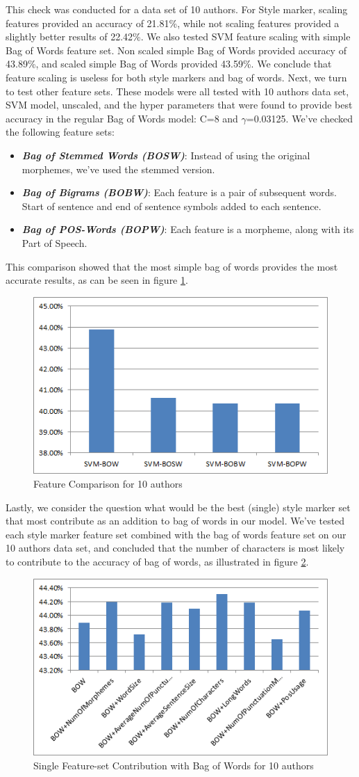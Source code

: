 \documentclass[a4paper]{article}
\begin{document}
This check was conducted for a data set of 10 authors.
For Style marker, scaling features provided an accuracy of 21.81\%, while not scaling features provided a slightly better results of 22.42\%.
We also tested SVM feature scaling with simple Bag of Words feature set.
Non scaled simple Bag of Words provided accuracy of 43.89\%, and scaled simple Bag of Words provided 43.59\%.
We conclude that feature scaling is useless for both style markers and bag of words.
Next, we turn to test other feature sets. These models were all tested with 10 authors data set, SVM model, unscaled, and the hyper parameters that were found to provide best accuracy in the regular Bag of Words model: C=8 and $\gamma$=0.03125. We've checked the following feature sets:
\begin{itemize}
\item \textbf{\emph{Bag of Stemmed Words (BOSW)}}: Instead of using the original morphemes, we've used the stemmed version.
\item \textbf{\emph{Bag of Bigrams (BOBW)}}: Each feature is a pair of subsequent words. Start of sentence and end of sentence symbols added to each sentence.
\item \textbf{\emph{Bag of POS-Words (BOPW)}}: Each feature is a morpheme, along with its Part of Speech.
\end{itemize}
This comparison showed that the most simple bag of words provides the most accurate results, as can be seen in figure \ref{fig:feature comparison}.
\begin{figure}[!h]
	\centering
	\includegraphics[width=.5\textwidth]{"figures/feature_comparison"}
	\caption{Feature Comparison for 10 authors}
	\label{fig:feature comparison}
\end{figure}
Lastly, we consider the question what would be the best (single) style marker set that most contribute as an addition to bag of words in our model.
We've tested each style marker feature set combined with the bag of words feature set on our 10 authors data set, and concluded that the number of characters is most likely to contribute to the accuracy of bag of words, as illustrated in figure \ref{fig:contribute}.
\begin{figure}[!h]
	\centering
	\includegraphics[width=.5\textwidth]{"figures/contribute"}
	\caption{Single Feature-set Contribution with Bag of Words for 10 authors}
	\label{fig:contribute}
\end{figure}
\end{document}
